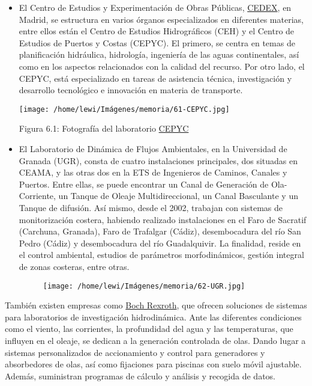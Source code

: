 \documentclass[]{article}
\begin{document}
\begin{itemize}
\item
  El Centro de Estudios y Experimentación de Obras Públicas,
  \href{http://www.cedex.es/CEDEX/LANG_CASTELLANO/ORGANISMO/CENTYLAB/}{CEDEX},
  en Madrid, se estructura en varios órganos especializados en
  diferentes materias, entre ellos están el Centro de Estudios
  Hidrográficos (CEH) y el Centro de Estudios de Puertos y Costas
  (CEPYC). El primero, se centra en temas de planificación hidráulica,
  hidrología, ingeniería de las aguas continentales, así como en los
  aspectos relacionados con la calidad del recurso. Por otro lado, el
  CEPYC, está especializado en tareas de asistencia técnica,
  investigación y desarrollo tecnológico e innovación en materia de
  transporte.

  \texttt{[image: /home/lewi/Imágenes/memoria/61-CEPYC.jpg]}

  Figura 6.1: Fotografía del laboratorio
  \href{http://www.cedex.es/CEDEX/LANG_CASTELLANO/ORGANISMO/CENTYLAB/CEPYC/EQUIPAMIENTO/LEM0.htm}{CEPYC}
\end{itemize}

\begin{itemize}
\item
  El Laboratorio de Dinámica de Flujos Ambientales, en la Universidad de
  Granada (UGR), consta de cuatro instalaciones principales, dos
  situadas en CEAMA, y las otras dos en la ETS de Ingenieros de Caminos,
  Canales y Puertos. Entre ellas, se puede encontrar un Canal de
  Generación de Ola-Corriente, un Tanque de Oleaje Multidireccional, un
  Canal Basculante y un Tanque de difusión. Así mismo, desde el 2002,
  trabajan con sistemas de monitorización costera, habiendo realizado
  instalaciones en el Faro de Sacratif (Carchuna, Granada), Faro de
  Trafalgar (Cádiz), desembocadura del río San Pedro (Cádiz) y
  desembocadura del río Guadalquivir. La finalidad, reside en el control
  ambiental, estudios de parámetros morfodinámicos, gestión integral de
  zonas costeras, entre otras.

  \begin{figure}
  \centering
  \texttt{[image: /home/lewi/Imágenes/memoria/62-UGR.jpg]}
  \caption{}
  \end{figure}
\end{itemize}

También existen empresas como
\href{https://www.boschrexroth.com/es/mx/industrias/aplicaciones-e-ingenieria-de-maquinaria/investigacion-hidrodinamica/hydrodynamic-research-1}{Boch
Rexroth}, que ofrecen soluciones de sistemas para laboratorios de
investigación hidrodinámica. Ante las diferentes condiciones como el
viento, las corrientes, la profundidad del agua y las temperaturas, que
influyen en el oleaje, se dedican a la generación controlada de olas.
Dando lugar a sistemas personalizados de accionamiento y control para
generadores y absorbedores de olas, así como fijaciones para piscinas
con suelo móvil ajustable. Además, suministran programas de cálculo y
análisis y recogida de datos.\\
\end{document}
